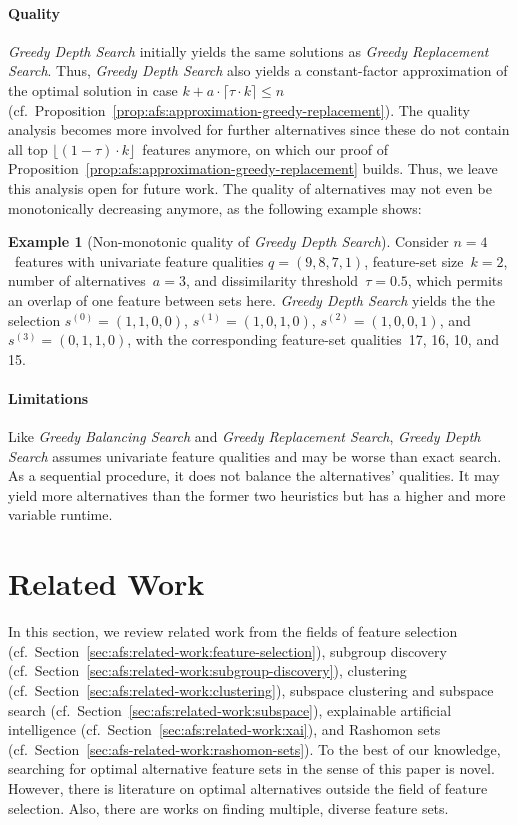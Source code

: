 \documentclass{article}
\theoremstyle{definition}
\newtheorem{example}{Example}
\begin{document}
\paragraph{Quality}

\emph{Greedy Depth Search} initially yields the same solutions as \emph{Greedy Replacement Search}.
Thus, \emph{Greedy Depth Search} also yields a constant-factor approximation of the optimal solution in case $k + a \cdot \lceil \tau \cdot k \rceil \leq n$ (cf.~Proposition~\ref{prop:afs:approximation-greedy-replacement}).
The quality analysis becomes more involved for further alternatives since these do not contain all top $\lfloor (1 - \tau) \cdot k \rfloor$~features anymore, on which our proof of Proposition~\ref{prop:afs:approximation-greedy-replacement} builds.
Thus, we leave this analysis open for future work.
The quality of alternatives may not even be monotonically decreasing anymore, as the following example shows:
%
\begin{example}[Non-monotonic quality of \emph{Greedy Depth Search}]
	Consider $n=4$~features with univariate feature qualities $q = (9,8,7,1)$, feature-set size~$k=2$, number of alternatives~$a=3$, and dissimilarity threshold~$\tau = 0.5$, which permits an overlap of one feature between sets here.
	\emph{Greedy Depth Search} yields the the selection $s^{(0)} = (1,1,0,0)$, $s^{(1)} = (1,0,1,0)$, $s^{(2)} = (1,0,0,1)$, and $s^{(3)} = (0,1,1,0)$, with the corresponding feature-set qualities~17, 16, 10, and 15.
	\label{ex:afs:greedy-depth:non-monotonic}
\end{example}

\paragraph{Limitations}

Like \emph{Greedy Balancing Search} and \emph{Greedy Replacement Search}, \emph{Greedy Depth Search} assumes univariate feature qualities and may be worse than exact search.
As a sequential procedure, it does not balance the alternatives' qualities.
It may yield more alternatives than the former two heuristics but has a higher and more variable runtime.

\section{Related Work}
\label{sec:afs:related-work}

In this section, we review related work from the fields of feature selection (cf.~Section~\ref{sec:afs:related-work:feature-selection}), subgroup discovery (cf.~Section~\ref{sec:afs:related-work:subgroup-discovery}), clustering (cf.~Section~\ref{sec:afs:related-work:clustering}), subspace clustering and subspace search (cf.~Section~\ref{sec:afs:related-work:subspace}), explainable artificial intelligence (cf.~Section~\ref{sec:afs:related-work:xai}),
and Rashomon sets (cf.~Section~\ref{sec:afs-related-work:rashomon-sets}).
To the best of our knowledge, searching for optimal alternative feature sets in the sense of this paper is novel.
However, there is literature on optimal alternatives outside the field of feature selection.
Also, there are works on finding multiple, diverse feature sets.
\end{document}
